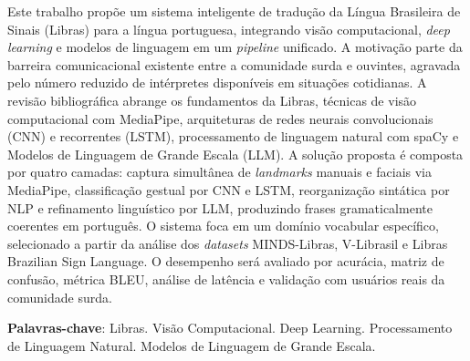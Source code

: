 \documentclass[
    12pt,                %
    openright,           %
    oneside,             %
    a4paper,             %
    english,             %
    brazil               %
]{abntex2}
\begin{document}

\frenchspacing

\pretextual

\imprimircapa

\imprimirfolhaderosto

\begin{resumo}

Este trabalho propõe um sistema inteligente de tradução da Língua Brasileira de Sinais (Libras) para a língua portuguesa, integrando visão computacional, \textit{deep learning} e modelos de linguagem em um \textit{pipeline} unificado. A motivação parte da barreira comunicacional existente entre a comunidade surda e ouvintes, agravada pelo número reduzido de intérpretes disponíveis em situações cotidianas. A revisão bibliográfica abrange os fundamentos da Libras, técnicas de visão computacional com MediaPipe, arquiteturas de redes neurais convolucionais (CNN) e recorrentes (LSTM), processamento de linguagem natural com spaCy e Modelos de Linguagem de Grande Escala (LLM). A solução proposta é composta por quatro camadas: captura simultânea de \textit{landmarks} manuais e faciais via MediaPipe, classificação gestual por CNN e LSTM, reorganização sintática por NLP e refinamento linguístico por LLM, produzindo frases gramaticalmente coerentes em português. O sistema foca em um domínio vocabular específico, selecionado a partir da análise dos \textit{datasets} MINDS-Libras, V-Librasil e Libras Brazilian Sign Language. O desempenho será avaliado por acurácia, matriz de confusão, métrica BLEU, análise de latência e validação com usuários reais da comunidade surda.

\vspace{\onelineskip}

\noindent
\textbf{Palavras-chave}: Libras. Visão Computacional. Deep Learning. Processamento de Linguagem Natural. Modelos de Linguagem de Grande Escala.
\end{resumo}
\end{document}
